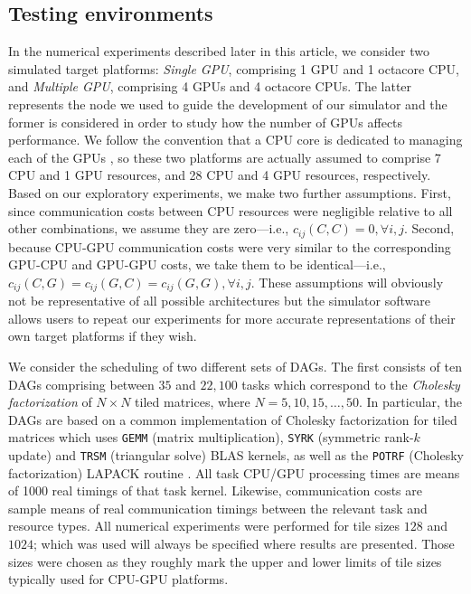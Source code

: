 \documentclass[runningheads]{llncs}
\begin{document}
\subsection{Testing environments}
\label{subsect.testing_environment}

In the numerical experiments described later in this article, we consider two simulated target platforms: {\em Single GPU}, comprising 1 GPU and 1 octacore CPU, and {\em Multiple GPU}, comprising 4 GPUs and 4 octacore CPUs. The latter represents the node we used to guide the development of our simulator and the former is considered in order to study how the number of GPUs affects performance. We follow the convention that a CPU core is dedicated to managing each of the GPUs \cite{augonnet2011starpu}, so these two platforms are actually assumed to comprise 7 CPU and 1 GPU resources, and 28 CPU and 4 GPU resources, respectively. Based on our exploratory experiments, we make two further assumptions. First, since communication costs between CPU resources were negligible relative to all other combinations, we assume they are zero---i.e., $c_{ij}(C, C) = 0, \forall i, j$. Second, because CPU-GPU communication costs were very similar to the corresponding GPU-CPU and GPU-GPU costs, we take them to be identical---i.e., $c_{ij}(C, G) = c_{ij}(G, C) = c_{ij}(G, G), \forall i, j$. These assumptions will obviously not be representative of all possible architectures but the simulator software allows users to repeat our experiments for more accurate representations of their own target platforms if they wish. 

We consider the scheduling of two different sets of DAGs. The first consists of ten DAGs comprising between $35$ and $22,100$ tasks which correspond to the {\em Cholesky factorization} of $N \times N$ tiled matrices, where $N = 5, 10, 15, \dots, 50$. In particular, the DAGs are based on a common implementation of Cholesky factorization for tiled matrices which uses {\tt GEMM} (matrix multiplication), {\tt SYRK} (symmetric rank-$k$ update) and {\tt TRSM} (triangular solve) BLAS kernels, as well as the {\tt POTRF} (Cholesky factorization) LAPACK routine \cite{Dongarra:1990:SLB:77626.79170}. All task CPU/GPU processing times are means of 1000 real timings of that task kernel. Likewise, communication costs are sample means of real communication timings between the relevant task and resource types. All numerical experiments were performed for tile sizes $128$ and $1024$; which was used will always be specified where results are presented. Those sizes were chosen as they roughly mark the upper and lower limits of tile sizes typically used for CPU-GPU platforms.
\end{document}
